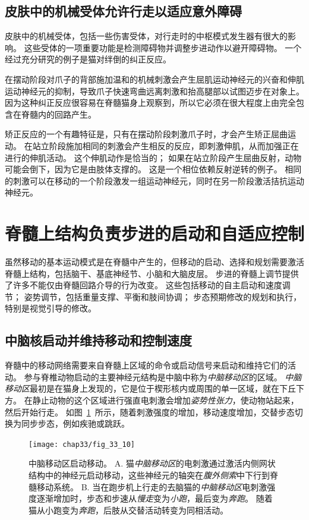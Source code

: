 \subsection{皮肤中的机械受体允许行走以适应意外障碍}

皮肤中的机械受体，包括一些伤害受体，对行走时的中枢模式发生器有很大的影响。
这些受体的一项重要功能是检测障碍物并调整步进动作以避开障碍物。
一个经过充分研究的例子是猫对绊倒的纠正反应。


在摆动阶段对爪子的背部施加温和的机械刺激会产生屈肌运动神经元的兴奋和伸肌运动神经元的抑制，导致爪子快速弯曲远离刺激和抬高腿部以试图迈步在对象上。
因为这种纠正反应很容易在脊髓猫身上观察到，所以它必须在很大程度上由完全包含在脊髓内的回路产生。


矫正反应的一个有趣特征是，只有在摆动阶段刺激爪子时，才会产生矫正屈曲运动。
在站立阶段施加相同的刺激会产生相反的反应，即刺激伸肌，从而加强正在进行的伸肌活动。
这个伸肌动作是恰当的；
如果在站立阶段产生屈曲反射，动物可能会倒下，因为它是由肢体支撑的。
这是一个相位依赖反射逆转的例子。
相同的刺激可以在移动的一个阶段激发一组运动神经元，同时在另一阶段激活拮抗运动神经元。



\section{脊髓上结构负责步进的启动和自适应控制}

虽然移动的基本运动模式是在脊髓中产生的，但移动的启动、选择和规划需要激活脊髓上结构，包括脑干、基底神经节、小脑和大脑皮层。
步进的脊髓上调节提供了许多不能仅由脊髓回路介导的行为改变。
这些包括移动的自主启动和速度调节；
姿势调节，包括重量支撑、平衡和肢间协调；
步态预期修改的规划和执行，特别是视觉引导的修改。



\subsection{中脑核启动并维持移动和控制速度}

脊髓中的移动网络需要来自脊髓上区域的命令或启动信号来启动和维持它们的活动。
参与脊椎动物启动的主要神经元结构是中脑中称为\textit{中脑移动区}的区域。
\textit{中脑移动区}最初是在猫身上发现的，它是位于楔形核内或周围的单一区域，就在下丘下方。
在静止动物的这个区域进行强直电刺激会增加\textit{姿势性张力}，使动物站起来，然后开始行走。
如图~\ref{fig:33_10}~所示，随着刺激强度的增加，移动速度增加，交替步态切换为同步步态，例如疾驰或跳跃。


\begin{figure}[htbp]
	\centering
	\texttt{[image: chap33/fig\_33\_10]}
	\caption{中脑移动区启动移动。
		A. 猫\textit{中脑移动区}的电刺激通过激活内侧网状结构中的神经元启动移动，这些神经元的轴突在\textit{腹外侧索}中下行到脊髓移动系统。
		B. 当在跑步机上行走的去脑猫的\textit{中脑移动区}电刺激强度逐渐增加时，步态和步速从\textit{慢走}变为\textit{小跑}，最后变为\textit{奔跑}。
		随着猫从小跑变为\textit{奔跑}，后肢从交替活动转变为同相活动。}
	\label{fig:33_10}
\end{figure}


